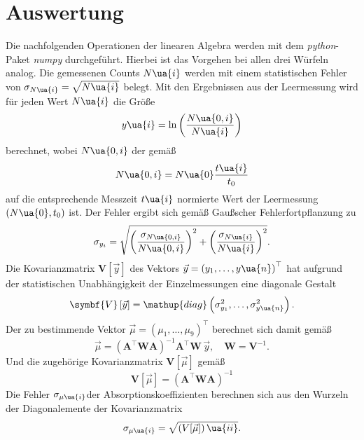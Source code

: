 \section{Auswertung}
Die nachfolgenden Operationen der linearen Algebra werden mit dem \emph{python}-Paket
\emph{numpy}\cite{numpy} durchgeführt. Hierbei ist das Vorgehen bei allen drei Würfeln %
analog. Die gemessenen Counts $N\ua{i}$ werden mit einem statistischen Fehler
von $\sigma_{N\ua{i}} = \sqrt{N\ua{i}}$ belegt. Mit den Ergebnissen aus
der Leermessung wird für jeden Wert $N\ua{i}$ die Größe
\begin{equation}
  y\ua{i} = \ln\left(\frac{N\ua{0, i}}{N\ua{i}} \right)
  \label{eq: y}
\end{equation}
berechnet, wobei $N\ua{0, i}$ der gemäß
\begin{equation}
  N\ua{0, i} = N\ua{0} \frac{t\ua{i}}{t_0}
  \label{eq: count_skalierung}
\end{equation}
auf die entsprechende Messzeit $t\ua{i}$ normierte Wert der Leermessung $(N\ua{0}, t_0)$ ist.
Der Fehler ergibt sich gemäß Gaußscher Fehlerfortpflanzung zu
\begin{equation}
  \sigma_{y_i} = \sqrt{\left(\frac{\sigma_{N\ua{0, i}}}{N\ua{0, i}} \right)^2 +    \left(\frac{\sigma_{N\ua{i}}}{N\ua{i}} \right)^2}.
\end{equation}
Die Kovarianzmatrix $\symbf{V}\left[\vec{y}\right]$ des Vektors $\vec{y} = \left(y_1, \dots , y\ua{n} \right)^\top$ hat aufgrund der statistischen Unabhängigkeit der
Einzelmessungen eine diagonale Gestalt
\begin{equation}
  \symbf{V}\left[\vec{y}\right] = \mathup{diag}\left(\sigma_{y_1}^2, \dots , \sigma_{y\ua{n}}^2 \right).
\end{equation}
Der zu bestimmende Vektor $\vec{\mu} = \left(\mu_1, \dots , \mu_9 \right)^\top$ berechnet sich damit gemäß %
\begin{equation}
  \vec{\mu} = \left(\symbf{A}^\top \symbf{W} \symbf{A}\right)^{-1}  \symbf{A}^\top \symbf{W} \, \vec{y}, \quad \symbf{W} = \symbf{V}^{-1}.
  \label{eq: mu}
\end{equation}
Und die zugehörige Kovarianzmatrix $\symbf{V}[\vec{\mu}]$ gemäß
\begin{equation}
  \symbf{V}\left[\vec{\mu}\right] = \left( \symbf{A}^\top \symbf{W}  \symbf{A}\right)^{-1}
\end{equation}
Die Fehler $\sigma_{\mu\ua{i}}$der Absorptionskoeffizienten berechnen sich aus den Wurzeln der Diagonalemente der Kovarianzmatrix
\begin{equation}
 \sigma_{\mu\ua{i}} = \sqrt{\left(V[\vec{\mu}]\right)\ua{ii}}.
 \label{eq: sigma_mu}
\end{equation}

